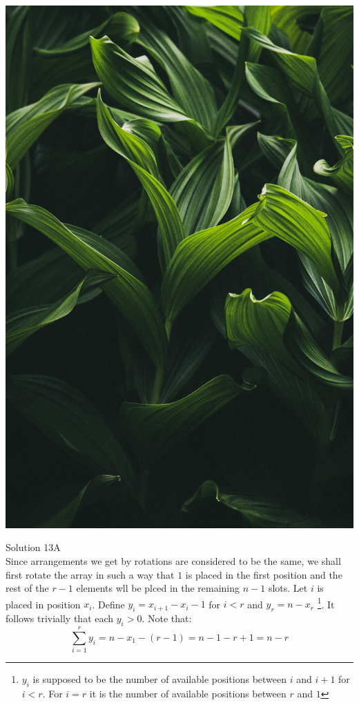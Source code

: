 \documentclass{tufte-book}
\begin{document}
\begin{marginfigure}
	\includegraphics{13.jpg}
\end{marginfigure} 
\noindent
\large{Solution 13A}\\
Since arrangements we get by rotations are considered to be the same, we shall  first rotate the array in such a way that $1$ is placed in the first position and the rest of the $r-1$ elements wll be plced in the remaining $n-1$ slots. Let $i$ is placed in position $x_i$. Define $y_i=x_{i+1}-x_{i}-1$ for $i<r$ and $y_r=n-x_r$ \footnote{$y_i$ is supposed to be the number of available positions between $i$ and ${i+1}$ for $i<r$. For $i=r$ it is the number of available positions between $r$ and $1$}. It follows trivially that each $y_i>0$. 
Note that:
$$\sum_{i=1}^r y_i=n-x_1-(r-1)=n-1-r+1=n-r$$
\end{document}

